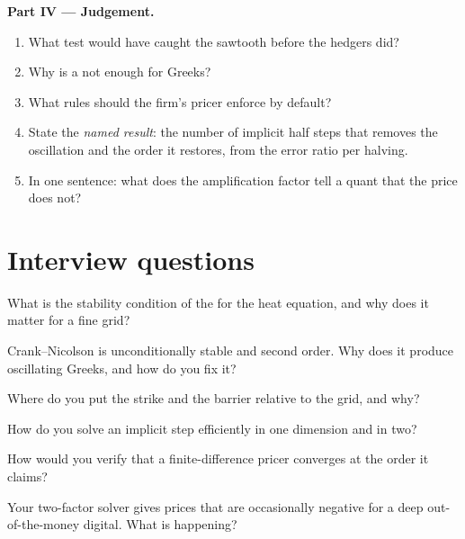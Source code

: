 \begin{problem}
\medskip\noindent\textbf{Part IV --- Judgement.}
\begin{enumerate}[resume]
\item What test would have caught the sawtooth before the hedgers did?
\item Why is a  not enough for Greeks?
\item What rules should the firm's pricer enforce by default?
\item State the \emph{named result}: the number of implicit half steps that removes the oscillation and the order it restores, from the error ratio per halving.
\item In one sentence: what does the amplification factor tell a quant that the price does not?
\end{enumerate}
\end{problem}

\section{Interview questions}

\begin{interviewq}\label{iq:qm:finite-difference-methods:1}
What is the stability condition of the  for the heat equation, and why does it matter for a fine grid?
\end{interviewq}

\begin{interviewq}\label{iq:qm:finite-difference-methods:2}
Crank--Nicolson is unconditionally stable and second order. Why does it produce oscillating Greeks, and how do you fix it?
\end{interviewq}

\begin{interviewq}\label{iq:qm:finite-difference-methods:3}
Where do you put the strike and the barrier relative to the grid, and why?
\end{interviewq}

\begin{interviewq}\label{iq:qm:finite-difference-methods:4}
How do you solve an implicit step efficiently in one dimension and in two?
\end{interviewq}

\begin{interviewq}\label{iq:qm:finite-difference-methods:5}
How would you verify that a finite-difference pricer converges at the order it claims?
\end{interviewq}

\begin{interviewq}\label{iq:qm:finite-difference-methods:6}
Your two-factor solver gives prices that are occasionally negative for a deep out-of-the-money digital. What is happening?
\end{interviewq}
